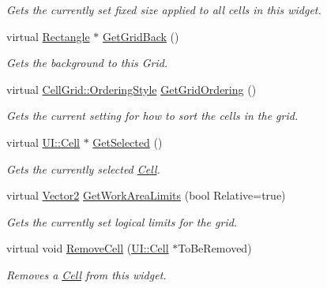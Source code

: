 \begin{DoxyCompactItemize}
\begin{DoxyCompactList}\small\item\em Gets the currently set fixed size applied to all cells in this widget. \item\end{DoxyCompactList}\item 
virtual \hyperlink{classMezzanine_1_1UI_1_1Rectangle}{Rectangle} $\ast$ \hyperlink{classMezzanine_1_1UI_1_1CellGrid_a56d852192197e405ccc4b12a4b7fe2ce}{GetGridBack} ()
\begin{DoxyCompactList}\small\item\em Gets the background to this Grid. \item\end{DoxyCompactList}\item 
virtual \hyperlink{classMezzanine_1_1UI_1_1CellGrid_ab054f3bbb294e4a584b8ab63b4d3f237}{CellGrid::OrderingStyle} \hyperlink{classMezzanine_1_1UI_1_1CellGrid_a9bac2c8bbb242176b29d2102febe2d89}{GetGridOrdering} ()
\begin{DoxyCompactList}\small\item\em Gets the current setting for how to sort the cells in the grid. \item\end{DoxyCompactList}\item 
virtual \hyperlink{classMezzanine_1_1UI_1_1Cell}{UI::Cell} $\ast$ \hyperlink{classMezzanine_1_1UI_1_1CellGrid_ab2ba8fdab8c52b374291d0bb89bb9cc7}{GetSelected} ()
\begin{DoxyCompactList}\small\item\em Gets the currently selected \hyperlink{classMezzanine_1_1UI_1_1Cell}{Cell}. \item\end{DoxyCompactList}\item 
virtual \hyperlink{classMezzanine_1_1Vector2}{Vector2} \hyperlink{classMezzanine_1_1UI_1_1CellGrid_aec6daabfb59ae56385fbe60fe067b6b1}{GetWorkAreaLimits} (bool Relative=true)
\begin{DoxyCompactList}\small\item\em Gets the currently set logical limits for the grid. \item\end{DoxyCompactList}\item 
virtual void \hyperlink{classMezzanine_1_1UI_1_1CellGrid_ab3b93eb4e588899e51e68fbd4bf6b84e}{RemoveCell} (\hyperlink{classMezzanine_1_1UI_1_1Cell}{UI::Cell} $\ast$ToBeRemoved)
\begin{DoxyCompactList}\small\item\em Removes a \hyperlink{classMezzanine_1_1UI_1_1Cell}{Cell} from this widget. \item\end{DoxyCompactList}\item 

\end{DoxyCompactItemize}
